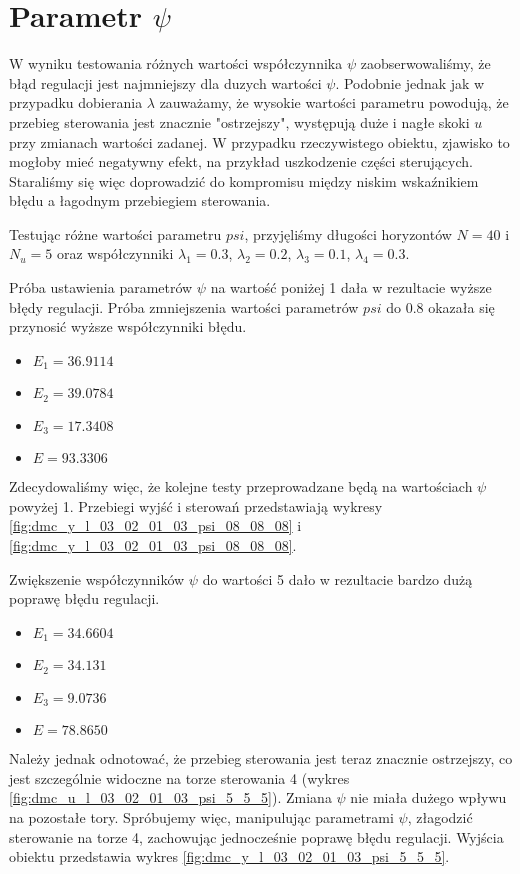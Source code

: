 \section{Parametr $\psi$}
W wyniku testowania różnych wartości współczynnika $\psi$ zaobserwowaliśmy, że błąd regulacji jest najmniejszy dla duzych wartości $\psi$. Podobnie jednak jak w przypadku dobierania $\lambda$ zauważamy, że wysokie wartości parametru powodują, że przebieg sterowania jest znacznie "ostrzejszy", występują duże i nagłe skoki $u$ przy zmianach wartości zadanej. W przypadku rzeczywistego obiektu, zjawisko to mogłoby mieć negatywny efekt, na przykład uszkodzenie części sterujących. Staraliśmy się więc doprowadzić do kompromisu między niskim wskaźnikiem błędu a łagodnym przebiegiem sterowania.

Testując różne wartości parametru $psi$, przyjęliśmy długości horyzontów $N=40$ i $N_u=5$ oraz współczynniki $\lambda_1=\num{0,3}$, $\lambda_2=\num{0,2}$, $\lambda_3=\num{0,1}$, $\lambda_4=\num{0,3}$.

Próba ustawienia parametrów $\psi$ na wartość poniżej 1 dała w rezultacie wyższe błędy regulacji.
Próba zmniejszenia wartości parametrów $psi$ do $\num{0,8}$ okazała się przynosić wyższe współczynniki błędu.
\begin{itemize}
\item $E_1=\num{36,9114}$
\item $E_2=\num{39,0784}$
\item $E_3=\num{17,3408}$
\item $E=\num{93,3306}$
\end{itemize}
Zdecydowaliśmy więc, że kolejne testy przeprowadzane będą na wartościach $\psi$ powyżej 1. Przebiegi wyjść i sterowań przedstawiają wykresy \ref{fig:dmc_y_l_03_02_01_03_psi_08_08_08} i \ref{fig:dmc_y_l_03_02_01_03_psi_08_08_08}.

Zwiększenie współczynników $\psi$ do wartości 5 dało w rezultacie bardzo dużą poprawę błędu regulacji.
\begin{itemize}
\item $E_1=\num{34,6604}$
\item $E_2=\num{34,131}$
\item $E_3=\num{9,0736}$
\item $E=\num{78,8650}$
\end{itemize}
Należy jednak odnotować, że przebieg sterowania jest teraz znacznie ostrzejszy, co jest szczególnie widoczne na torze sterowania 4 (wykres \ref{fig:dmc_u_l_03_02_01_03_psi_5_5_5}). Zmiana $\psi$ nie miała dużego wpływu na pozostałe tory. Spróbujemy więc, manipulując parametrami $\psi$, złagodzić sterowanie na torze 4, zachowując jednocześnie poprawę błędu regulacji. Wyjścia obiektu przedstawia wykres \ref{fig:dmc_y_l_03_02_01_03_psi_5_5_5}.

